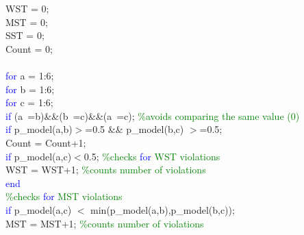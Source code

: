 \hspace{1mm}WST = 0; \\ 
\hspace{1mm}MST = 0; \\ 
\hspace{1mm}SST = 0; \\ 
\hspace{1mm}Count = 0; \\ 
\hspace{1mm} \\ 
\hspace{1mm}\textcolor{blue}{for} a = 1:6; \\ 
\hspace{1mm}\indent \textcolor{blue}{for} b = 1:6; \\ 
\hspace{1mm}\indent \indent \textcolor{blue}{for} c = 1:6; \\ 
\hspace{1mm}\indent \indent \indent \textcolor{blue}{if} (a~=b)\&\&(b~=c)\&\&(a~=c); \textcolor{green}{\%avoids comparing the same value (0) }\\ 
\hspace{1mm}\indent \indent \indent \indent \textcolor{blue}{if} p\_model(a,b)$>$=0.5 \&\& p\_model(b,c) $>$=0.5; \\ 
\hspace{1mm}\indent \indent \indent \indent \indent Count = Count+1; \\ 
\hspace{1mm}\indent \indent \indent \indent \indent \textcolor{blue}{if} p\_model(a,c)$<$0.5; \textcolor{green}{\%checks \textcolor{blue}{for} WST violations }\\ 
\hspace{1mm}\indent \indent \indent \indent \indent \indent \indent WST = WST+1; \textcolor{green}{\%counts number of violations }\\ 
\hspace{1mm}\indent \indent \indent \indent \indent \indent \textcolor{blue}{end} \\ 
\hspace{1mm}\indent \indent \indent \indent \indent \indent \textcolor{green}{\%checks \textcolor{blue}{for} MST violations }\\ 
\hspace{1mm}\indent \indent \indent \indent \indent \indent \indent \textcolor{blue}{if} p\_model(a,c) $<$ min(p\_model(a,b),p\_model(b,c)); \\ 
\hspace{1mm}\indent \indent \indent \indent \indent \indent \indent \indent MST = MST+1; \textcolor{green}{\%counts number of violations }\\ 
